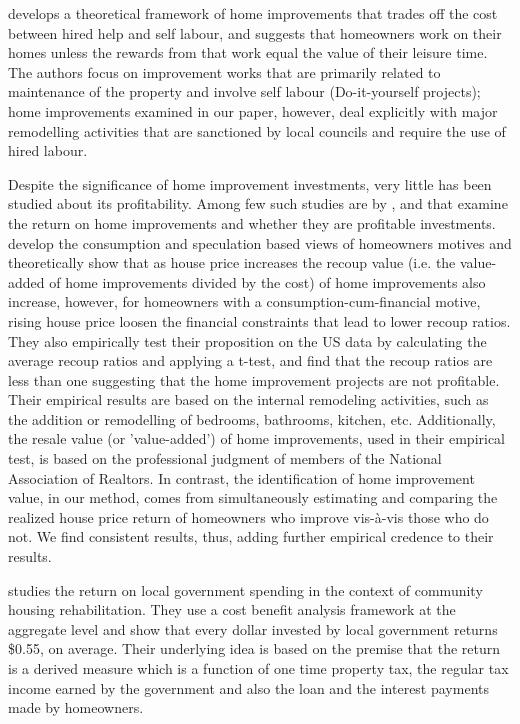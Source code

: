 \documentclass[AEJ,reqno, draftmode]{AEA} %
\begin{document}


\citet{mendelsohn1977empirical} develops a theoretical framework of home improvements that trades off the cost between hired help and self labour, and suggests that homeowners work on their homes unless the rewards from that work equal the value of their leisure time. The authors focus on improvement works that are primarily related to maintenance of the property and involve self labour (Do-it-yourself projects); 
home improvements examined in our paper, however, deal explicitly with major remodelling activities that are sanctioned by local councils and require the use of hired labour. 



Despite the significance of home improvement investments, very little has been studied about its profitability. Among few such studies are by \citet{choi2014speculating}, \citet{simons2009housing} and \cite{badcock1994snakes} that examine the return on home improvements and whether they are profitable investments. \citet{choi2014speculating} develop the consumption and speculation based views of homeowners motives and theoretically show that as house price increases the recoup value (i.e. the value-added of home improvements divided by the cost) of home improvements also increase, however, for homeowners with a consumption-cum-financial motive, rising house price loosen the financial constraints that lead to lower recoup ratios. They also empirically test their proposition on the US data by calculating the average recoup ratios and applying a t-test, and find that the recoup ratios are less than one suggesting that the home improvement projects are not profitable. Their empirical results are based on the internal remodeling activities, such as the addition or remodelling of bedrooms, bathrooms, kitchen, etc. Additionally, the resale value (or 'value-added') of home improvements, used in their empirical test, is based on the professional judgment of members of the National Association of Realtors. In contrast, the identification of home improvement value, in our method, comes from simultaneously estimating and comparing the realized house price return of homeowners who improve vis-à-vis those who do not. We find consistent results, thus, adding further empirical credence to their results.

\citet{simons2009housing} studies the return on local government spending in the context of community housing rehabilitation. They use a cost benefit analysis framework at the aggregate level and show that every dollar invested by local government returns \$0.55, on average. Their underlying idea is based on the premise that the return is a derived measure which is a function of one time property tax, the regular tax income earned by the government and also the loan and the interest payments made by homeowners. 
\end{document}

